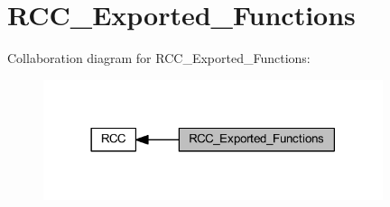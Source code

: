 \hypertarget{group___r_c_c___exported___functions}{}\section{R\+C\+C\+\_\+\+Exported\+\_\+\+Functions}
\label{group___r_c_c___exported___functions}
Collaboration diagram for R\+C\+C\+\_\+\+Exported\+\_\+\+Functions\+:
\nopagebreak
\begin{figure}[H]
\begin{center}
\leavevmode
\includegraphics[width=282pt]{group___r_c_c___exported___functions}
\end{center}
\end{figure}
